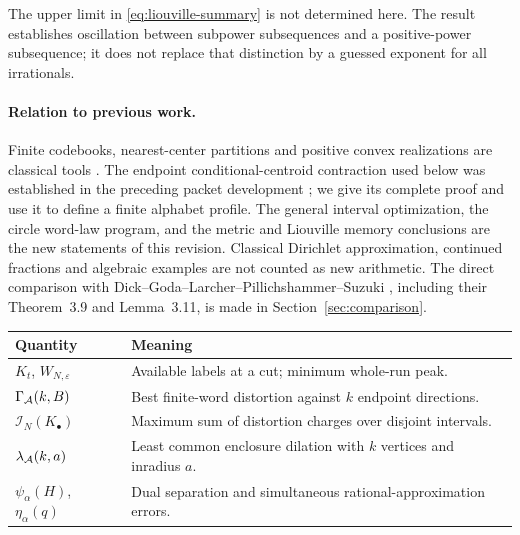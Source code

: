 The upper limit in \eqref{eq:liouville-summary} is not determined here. The result establishes oscillation between subpower subsequences and a positive-power subsequence; it does not replace that distinction by a guessed exponent for all irrationals.

\paragraph{Relation to previous work.}
Finite codebooks, nearest-center partitions and positive convex realizations are classical tools \cite{GL,Vidyasagar}. The endpoint conditional-centroid contraction used below was established in the preceding packet development \cite{GTF35,GTF42}; we give its complete proof and use it to define a finite alphabet profile. The general interval optimization, the circle word-law program, and the metric and Liouville memory conclusions are the new statements of this revision. Classical Dirichlet approximation, continued fractions and algebraic examples are not counted as new arithmetic. The direct comparison with Dick--Goda--Larcher--Pillichshammer--Suzuki \cite{DGLPS}, including their Theorem~3.9 and Lemma~3.11, is made in Section~\ref{sec:comparison}.

\begin{center}\small
\begin{tabular}{@{}p{}p{}@{}}\toprule
Quantity & Meaning \\\midrule
$K_t$, $W_{N,\varepsilon}$ & Available labels at a cut; minimum whole-run peak.\\
$\Gamma_{\mathcal A}(k,B)$ & Best finite-word distortion against $k$ endpoint directions.\\
$\mathcal I_N(K_\bullet)$ & Maximum sum of distortion charges over disjoint intervals.\\
$\lambda_{\mathcal A}(k,a)$ & Least common enclosure dilation with $k$ vertices and inradius $a$.\\
$\psi_\alpha(H)$, $\eta_\alpha(q)$ & Dual separation and simultaneous rational-approximation errors.\\\bottomrule
\end{tabular}
\end{center}
